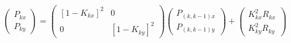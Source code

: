 \begin{eqnarray}\label{eqexpmuts}
\begin{pmatrix} P_{kx}  \\ P_{ky} \end{pmatrix}= \begin{pmatrix} [1-K_{kx}]^{2} & 0 \\ 0 & [1-K_{ky}]^{2} \end{pmatrix}\begin{pmatrix} P_{(k,k-1)x}  \\ P_{(k,k-1)y} \end{pmatrix}+\begin{pmatrix} K^{2}_{kx}     R_{kx}  \\  K^{2}_{ky}     R_{ky}  \end{pmatrix}
\end{eqnarray}
